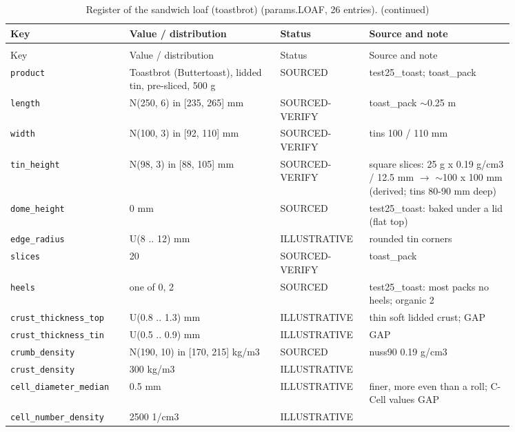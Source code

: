 \documentclass[10.5pt,a4paper]{article}
\begin{document}
{\scriptsize\begin{longtable}{@{}p{0.2\linewidth}p{0.27\linewidth}p{0.12\linewidth}p{0.26\linewidth}@{}}\caption{Register of the sandwich loaf (toastbrot) (params.LOAF, 26 entries).}\\\toprule Key & Value / distribution & Status & Source and note \\\midrule\endfirsthead
\caption[]{Register of the sandwich loaf (toastbrot) (params.LOAF, 26 entries). (continued)}\\\toprule Key & Value / distribution & Status & Source and note \\\midrule\endhead
\texttt{product} & Toastbrot (Buttertoast), lidded tin, pre-sliced, 500 g & SOURCED & test25\_toast; toast\_pack \\
\texttt{length} & N(250, 6) in [235, 265] mm & SOURCED-VERIFY & toast\_pack $\sim$0.25 m \\
\texttt{width} & N(100, 3) in [92, 110] mm & SOURCED-VERIFY & tins 100 / 110 mm \\
\texttt{tin\_\allowbreak{}height} & N(98, 3) in [88, 105] mm & SOURCED-VERIFY & square slices: 25 g x 0.19 g/cm3 / 12.5 mm $\to$ $\sim$100 x 100 mm (derived; tins 80-90 mm deep) \\
\texttt{dome\_\allowbreak{}height} & 0 mm & SOURCED & test25\_toast: baked under a lid (flat top) \\
\texttt{edge\_\allowbreak{}radius} & U(8 .. 12) mm & ILLUSTRATIVE & rounded tin corners \\
\texttt{slices} & 20 & SOURCED-VERIFY & toast\_pack \\
\texttt{heels} & one of 0, 2 & SOURCED & test25\_toast: most packs no heels; organic 2 \\
\texttt{crust\_\allowbreak{}thickness\_\allowbreak{}top} & U(0.8 .. 1.3) mm & ILLUSTRATIVE & thin soft lidded crust; GAP \\
\texttt{crust\_\allowbreak{}thickness\_\allowbreak{}tin} & U(0.5 .. 0.9) mm & ILLUSTRATIVE & GAP \\
\texttt{crumb\_\allowbreak{}density} & N(190, 10) in [170, 215] kg/m3 & SOURCED & nuss90 0.19 g/cm3 \\
\texttt{crust\_\allowbreak{}density} & 300 kg/m3 & ILLUSTRATIVE &  \\
\texttt{cell\_\allowbreak{}diameter\_\allowbreak{}median} & 0.5 mm & ILLUSTRATIVE & finer, more even than a roll; C-Cell values GAP \\
\texttt{cell\_\allowbreak{}number\_\allowbreak{}density} & 2500 1/cm3 & ILLUSTRATIVE &  \\

\end{longtable}}
\end{document}
